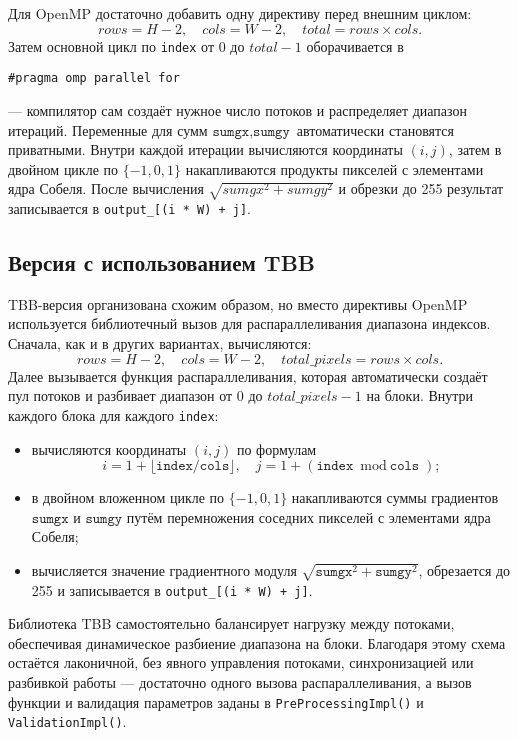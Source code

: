 \documentclass[12pt]{article}
\begin{document}
Для OpenMP достаточно добавить одну директиву перед внешним циклом:
\[
rows = H - 2,\quad cols = W - 2,\quad total = rows \times cols.
\]
Затем основной цикл по \texttt{index} от \(0\) до \(total - 1\) оборачивается в
\begin{verbatim}
#pragma omp parallel for
\end{verbatim}
— компилятор сам создаёт нужное число потоков и распределяет диапазон итераций. Переменные для сумм \(\texttt{sumgx}, \texttt{sumgy}\) автоматически становятся приватными. Внутри каждой итерации вычисляются координаты \((i,j)\), затем в двойном цикле по \(\{-1,0,1\}\) накапливаются продукты пикселей с элементами ядра Собеля. После вычисления \(\sqrt{sumgx^2 + sumgy^2}\) и обрезки до 255 результат записывается в \texttt{output\_[(i * W) + j]}.

\subsection{Версия с использованием TBB}

TBB-версия организована схожим образом, но вместо директивы OpenMP используется библиотечный вызов для распараллеливания диапазона индексов. Сначала, как и в других вариантах, вычисляются:
\[
rows = H - 2,\quad cols = W - 2,\quad total\_pixels = rows \times cols.
\]
Далее вызывается функция распараллеливания, которая автоматически создаёт пул потоков и разбивает диапазон от \(0\) до \(total\_pixels - 1\) на блоки. Внутри каждого блока для каждого \texttt{index}:
\begin{itemize}
    \item вычисляются координаты \((i,j)\) по формулам
    \[
        i = 1 + \bigl\lfloor \texttt{index} / \texttt{cols} \bigr\rfloor,\quad
        j = 1 + (\texttt{index} \bmod \texttt{cols});
    \]
    \item в двойном вложенном цикле по \(\{-1,0,1\}\) накапливаются суммы градиентов \(\texttt{sumgx}\) и \(\texttt{sumgy}\) путём перемножения соседних пикселей с элементами ядра Собеля;
    \item вычисляется значение градиентного модуля \(\sqrt{\texttt{sumgx}^2 + \texttt{sumgy}^2}\), обрезается до 255 и записывается в \texttt{output\_[(i * W) + j]}.
\end{itemize}
Библиотека TBB самостоятельно балансирует нагрузку между потоками, обеспечивая динамическое разбиение диапазона на блоки. Благодаря этому схема остаётся лаконичной, без явного управления потоками, синхронизацией или разбивкой работы — достаточно одного вызова распараллеливания, а вызов функции и валидация параметров заданы в \texttt{PreProcessingImpl()} и \texttt{ValidationImpl()}.
\end{document}
